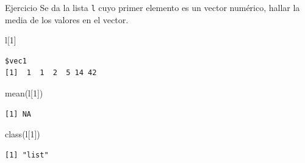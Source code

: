 \documentclass[
  ignorenonframetext,
  aspectratio=169,
  spanish,
]{beamer}
\newenvironment{Shaded}{\begin{snugshade}}{\end{snugshade}}
\newcommand{\DecValTok}[1]{\textcolor[rgb]{0.68,0.00,0.00}{#1}}
\newcommand{\FunctionTok}[1]{\textcolor[rgb]{0.28,0.35,0.67}{#1}}
\newcommand{\NormalTok}[1]{\textcolor[rgb]{0.00,0.23,0.31}{#1}}
\begin{document}
\begin{frame}[fragile]{Ejercicio}
\label{ejercicio}
Se da la lista \texttt{l} cuyo primer elemento es un vector numérico,
hallar la media de los valores en el vector.

\begin{Shaded}
\begin{Highlighting}[]
\NormalTok{l[}\DecValTok{1}\NormalTok{]}
\end{Highlighting}
\end{Shaded}

\begin{verbatim}
$vec1
[1]  1  1  2  5 14 42
\end{verbatim}

\begin{Shaded}
\begin{Highlighting}[]
\FunctionTok{mean}\NormalTok{(l[}\DecValTok{1}\NormalTok{])}
\end{Highlighting}
\end{Shaded}

\begin{verbatim}
[1] NA
\end{verbatim}

\begin{Shaded}
\begin{Highlighting}[]
\FunctionTok{class}\NormalTok{(l[}\DecValTok{1}\NormalTok{]) }
\end{Highlighting}
\end{Shaded}

\begin{verbatim}
[1] "list"
\end{verbatim}
\end{frame}
\end{document}

